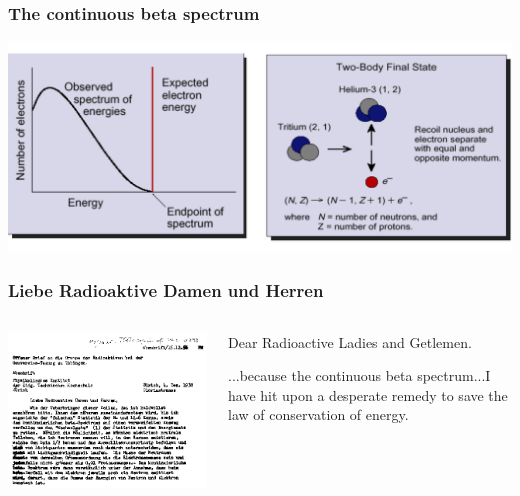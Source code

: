 \begin{frame}
\frametitle{The continuous beta spectrum}
\includegraphics[scale=0.38]{img/beta-ray.png}
\end{frame}

\begin{frame}
\frametitle{Liebe Radioaktive Damen und Herren}
\begin{columns}
 
\includegraphics[scale=0.4]{img/liebe.png}
 
\begin{block}{}
Dear Radioactive Ladies and Getlemen.

...because the continuous beta spectrum...I have hit upon a desperate remedy to save the law of conservation of energy.

\end{block}
\end{columns}
\end{frame}

